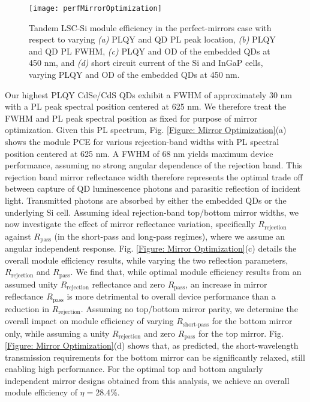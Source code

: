 \documentclass[conference]{./pvsctran}
\begin{document}
		\begin{figure*}[t]
			\centering
			\texttt{[image: perfMirrorOptimization]}
			\caption{Tandem LSC-Si module efficiency in the perfect-mirrors case with respect to varying \textit{(a)} PLQY and QD PL peak location, \textit{(b)} PLQY and QD PL FWHM, \textit{(c)} PLQY and OD of the embedded QDs at 450 nm, and \textit{(d)} short circuit current of the Si and InGaP cells, varying PLQY and OD of the embedded QDs at 450 nm.}
			\label{Figure: Perfect Mirror Optimization}
		\end{figure*}
		
		Our highest PLQY CdSe/CdS QDs exhibit a FWHM of approximately 30 nm with a PL peak spectral position centered at 625 nm. We therefore treat the FWHM and PL peak spectral position as fixed for purpose of mirror optimization. Given this PL spectrum, Fig. \ref{Figure: Mirror Optimization}(a) shows the module PCE for various rejection-band widths with PL spectral position centered at 625 nm. A FWHM of 68 nm yields maximum device performance, assuming no strong angular dependence of the rejection band. This rejection band mirror reflectance width therefore represents the optimal trade off between capture of QD luminescence photons and parasitic reflection of incident light.  Transmitted photons are absorbed by either the embedded QDs or the underlying Si cell. Assuming ideal rejection-band top/bottom mirror widths, we now investigate the effect of mirror reflectance variation, specifically $R_\text{rejection}$ against $R_\text{pass}$ (in the short-pass and long-pass regimes), where we assume an angular independent response. Fig. \ref{Figure: Mirror Optimization}(c) details the overall module efficiency results, while varying the two reflection parameters, $R_\text{rejection}$ and $R_\text{pass}$. We find that, while optimal module efficiency results from an assumed unity $R_\text{rejection}$ reflectance and zero $R_\text{pass}$, an increase in mirror reflectance $R_\text{pass}$ is more detrimental to overall device performance than a reduction in $R_\text{rejection}$. Assuming no top/bottom mirror parity, we determine the overall impact on module efficiency of varying $R_\text{short-pass}$ for the bottom mirror only, while assuming a unity $R_\text{rejection}$ and zero $R_\text{pass}$ for the top mirror. Fig. \ref{Figure: Mirror Optimization}(d) shows that, as predicted, the short-wavelength transmission requirements for the bottom mirror can be significantly relaxed, still enabling high performance. For the optimal top and bottom angularly independent mirror designs obtained from this analysis, we achieve an overall module efficiency of $\eta = 28.4$\%.
		
\end{document}
